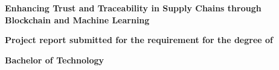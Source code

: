 
\thispagestyle{empty}
\singlespacing
\begin{titlepage}
\begin{center}
    \centering
     
      
  {{\Large \textbf{Enhancing Trust and Traceability in Supply Chains 
  through Blockchain and Machine Learning}\par}}
    \vspace{1cm}%
     
    \vspace{0.4cm}
    {
    \textbf{\large Project report submitted for the requirement for the degree of } \par}
    \vspace{0.2cm}


\vspace{0.5cm}
    {
    \textbf{\large Bachelor of Technology \\ \vspace{1mm} } \par}
    \vspace{2mm}


    


\end{center}
\end{titlepage}
